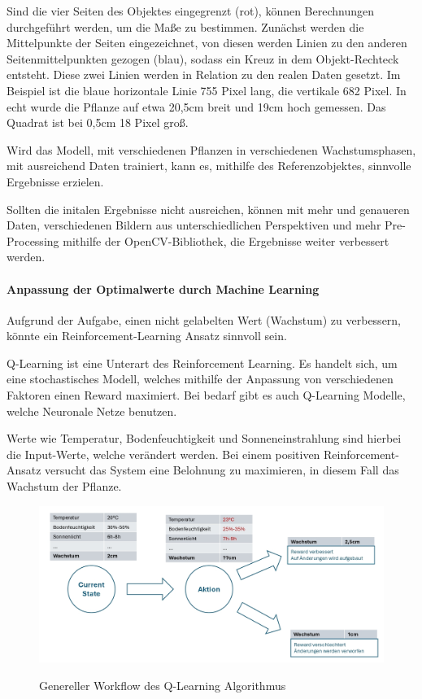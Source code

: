 Sind die vier Seiten des Objektes eingegrenzt (rot), können Berechnungen durchgeführt werden, um die Maße zu bestimmen. Zunächst werden die Mittelpunkte der Seiten eingezeichnet, von diesen werden Linien zu den anderen Seitenmittelpunkten gezogen (blau), sodass  ein Kreuz in dem Objekt-Rechteck entsteht. Diese zwei Linien werden in Relation zu den realen Daten gesetzt. 
Im Beispiel ist die blaue horizontale Linie 755 Pixel lang, die vertikale 682 Pixel. In echt wurde die Pflanze auf etwa 20,5cm breit und 19cm hoch gemessen. Das Quadrat ist bei 0,5cm 18 Pixel groß.

Wird das Modell, mit verschiedenen Pflanzen in verschiedenen Wachstumsphasen, mit ausreichend Daten trainiert, kann es, mithilfe des Referenzobjektes, sinnvolle Ergebnisse erzielen.

Sollten die initalen Ergebnisse nicht ausreichen, können mit mehr und genaueren Daten, verschiedenen Bildern aus unterschiedlichen Perspektiven und mehr Pre-Processing mithilfe der OpenCV-Bibliothek, die Ergebnisse weiter verbessert werden.

\paragraph{Anpassung der Optimalwerte durch Machine Learning}
Aufgrund der Aufgabe, einen nicht gelabelten Wert (Wachstum) zu verbessern, könnte ein Reinforcement-Learning Ansatz sinnvoll sein.

Q-Learning ist eine Unterart des Reinforcement Learning. Es handelt sich, um eine stochastisches Modell, welches mithilfe der Anpassung von verschiedenen Faktoren einen Reward maximiert. Bei bedarf gibt es auch Q-Learning Modelle, welche Neuronale Netze benutzen.

Werte wie Temperatur, Bodenfeuchtigkeit und Sonneneinstrahlung sind hierbei die Input-Werte, welche verändert werden. Bei einem positiven Reinforcement-Ansatz versucht das System eine Belohnung zu maximieren, in diesem Fall das Wachstum der Pflanze.

\begin{figure}[H]
\centering
\includegraphics[width=\textwidth]{images/machineDiagram.jpg}
\caption{Genereller Workflow des Q-Learning Algorithmus}\cite{rainpoint_smart_timer}
\label{fig:rainpointDiagram}
\end{figure}

